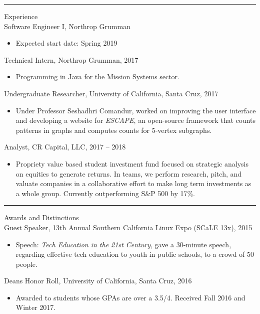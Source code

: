 \documentclass{res}
\begin{document}
\begin{resume}
\hrule width18.5cm

{\huge Experience}\\[2mm]
{\Large Software Engineer I, Northrop Grumman}\\
	\begin{itemize}
		\vspace{-3mm}
		\item Expected start date: Spring 2019
	\end{itemize}
{\Large Technical Intern, Northrop Grumman, 2017}\\
	\begin{itemize}
		\vspace{-3mm}
		\item Programming in Java for the Mission Systems sector.
	\end{itemize}
{\Large Undergraduate Researcher, University of California, Santa Cruz, 2017}\\
	\begin{itemize}
		\vspace{-3mm}
		\item Under Professor Seshadhri Comandur, worked on improving the user interface and developing a website for \textit{ESCAPE}, an open-source framework that counts patterns in graphs and computes counts for 5-vertex subgraphs.
	\end{itemize}
{\Large Analyst, CR Capital, LLC, 2017 -- 2018}\\
	\begin{itemize}
		\vspace{-3mm}
		\item Propriety value based student investment fund focused on strategic analysis on equities to generate returns. In teams, we perform research, pitch, and valuate companies in a collaborative effort to make long term investments as a whole group. Currently outperforming S\&P 500 by 17\%.
	\end{itemize}
	\vspace{2mm}

\hrule width18.5cm

{\huge Awards and Distinctions}\\[2mm]
{\Large Guest Speaker, 13th Annual Southern California Linux Expo (SCaLE 13x), 2015}\\
	\begin{itemize}
		\vspace{-3mm}
		\item Speech: \textit{Tech Education in the 21st Century}, gave a 30-minute speech, regarding effective tech education to youth in public schools, to a crowd of 50 people.
	\end{itemize}
{\Large Dean\textquotesingle s Honor Roll, University of California, Santa Cruz, 2016}\\
	\begin{itemize}
		\vspace{-3mm}
		\item Awarded to students whose GPAs are over a 3.5/4. Received Fall 2016 and Winter 2017.
	\end{itemize}
\vspace{-1mm}

\end{resume}
\end{document}
